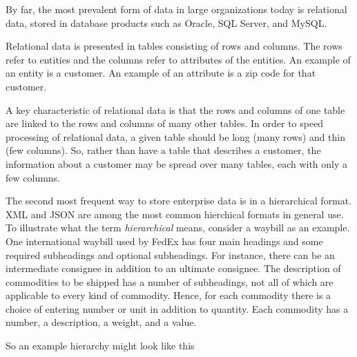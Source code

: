 \hypertarget{relational-data}{%
\label{relational-data}}

By far, the most prevalent form of data in large organizations today is
relational data, stored in database products such as Oracle, SQL Server,
and MySQL.

Relational data is presented in tables consisting of rows and columns.
The rows refer to entities and the columns refer to attributes of the
entities. An example of an entity is a customer. An example of an
attribute is a zip code for that customer.

A key characteristic of relational data is that the rows and columns of
one table are linked to the rows and columns of many other tables. In
order to speed processing of relational data, a given table should be
long (many rows) and thin (few columns). So, rather than have a table
that describes a customer, the information about a customer may be
spread over many tables, each with only a few columns.

\hypertarget{hierarchical-data}{%
\label{hierarchical-data}}

The second most frequent way to store enterprise data is in a
hierarchical format. XML and JSON are among the most common hierchical
formats in general use. To illustrate what the term \emph{hierarchical}
means, consider a waybill as an example. One international waybill used
by FedEx has four main headings and some required subheadings and
optional subheadings. For instance, there can be an intermediate
consignee in addition to an ultimate consignee. The description of
commodities to be shipped has a number of subheadings, not all of which
are applicable to every kind of commodity. Hence, for each commodity
there is a choice of entering number or unit in addition to quantity.
Each commodity has a number, a description, a weight, and a value.

So an example hierarchy might look like this

\begin{Shaded}
\begin{Highlighting}[]
\end{Highlighting}
\end{Shaded}

